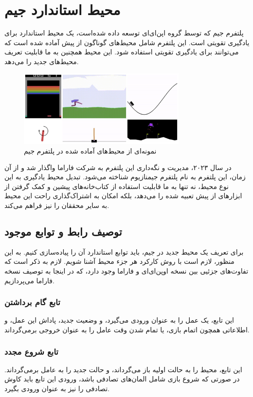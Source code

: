 \section{محیط استاندارد جیم}
پلتفرم جیم 
که توسط گروه اپن‌ای‌ای 
توسعه داده شده‌است،
یک محیط استاندارد برای یادگیری تقویتی است.
این پلتفرم شامل محیط‌های گوناگون از پیش آماده شده است که می‌توانند برای یادگیری تقویتی استفاده شود.
این محیط همچنین به ما قابلیت تعریف محیط‌های جدید را می‌دهد.
\begin{figure}
    \centering
    \includegraphics[width=0.75\textwidth]{images/openaigym.jpg}
    \caption{نمونه‌ای از محیط‌های آماده شده در پلتفرم جیم}\label{fig:gym}
    
\end{figure}
در سال ۲۰۲۳، 
مدیریت و نگه‌داری این پلتفرم به شرکت فاراما 
واگذار شد و از آن زمان، این پلتفرم به نام پلتفرم جیمنازیوم 
 شناخته می‌شود.
تبدیل محیط یادگیری به این نوع محیط، نه تنها به ما قابلیت استفاده از کتاب‌خانه‌های پیشین و کمک گرفتن از ابزار‌های
از پیش تعبیه شده را می‌دهد، بلکه امکان به اشتراک‌گذاری راحت این محیط به سایر محققان را نیز فراهم می‌کند.
\subsection{توصیف رابط و توابع موجود}
برای تعریف یک محیط جدید در جیم،
باید توابع استاندارد آن را پیاده‌سازی کنیم. به این منظور، لازم است با روش کارکرد هر جزء محیط آشنا شویم.
لازم به ذکر است که تفاوت‌های جزئیی بین نسخه اوپن‌ای‌ای و فاراما وجود دارد، که در اینجا به توصیف نسخه فاراما می‌پردازیم.
\subsubsection{تابع گام برداشتن}
این تابع، یک عمل را به عنوان ورودی می‌گیرد،
و وضعیت جدید، پاداش این عمل، و اطلاعاتی همچون اتمام بازی، یا تمام شدن وقت عامل را به عنوان خروجی برمی‌گرداند.
\subsubsection{تابع شروع مجدد}
این تابع، محیط را به حالت اولیه باز می‌گرداند، و حالت جدید را به عامل برمی‌گرداند.
در صورتی که شروع بازی شامل المان‌های تصادفی باشد، ورودی این تابع باید کاوش تصادفی  را نیز به عنوان ورودی بگیرد.
